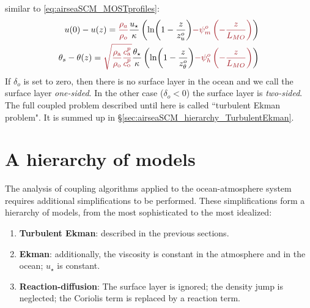 similar to \eqref{eq:airseaSCM_MOSTprofiles}:
\begin{equation}
\label{eq:airseaSCM_MOSTprofilesOSL}
\begin{aligned}
	u(0)-u(z) = \emphase{\frac{\rho_a}{\rho_o}}
	\frac{u_\star}{\kappa}
    \left(
	\ln(1-\frac{z}{z_{u}^o})
	\emphase{- \psi_m^o\left(-\frac{z}{L_{MO}}\right)}
    \right)
    \\
	\theta_s - \theta(z) = 
	\emphase{\sqrt{\frac{\rho_{\rm a}}{\rho_{\rm o}}
	\frac{c_{\rm a}^p}{c_{\rm o}^p}}}
	\frac{{\theta_\star}}{\kappa}
    \left(
	\ln(1-\frac{z}{z_{\theta}^o})
	\emphase{- \psi_h^o\left(-\frac{z}{L_{MO}}\right)}
\right)
\end{aligned}
\end{equation}
If $\delta_o$ is set to zero, then there is no surface layer
in the ocean and we call the surface layer \textit{one-sided}.
In the other case ($\delta_o<0$) the surface layer is
\textit{two-sided}.
The full coupled problem described until here
is called ``turbulent Ekman problem". It is summed up in
\S\ref{sec:airseaSCM_hierarchy_TurbulentEkman}.
\section{A hierarchy of models}
\label{sec:airseaSCM_hierarchy}
The analysis of coupling algorithms applied to the
ocean-atmosphere system requires additional
simplifications to be performed.
These simplifications form a hierarchy of models, from
the most sophisticated to the most idealized:
\begin{enumerate}
	\item \textbf{Turbulent Ekman}: described in the previous
		sections.
	\item \textbf{Ekman}: additionally,
		the viscosity is constant in the
		atmosphere and in the ocean; $u_\star$ is constant.
	\item \textbf{Reaction-diffusion}: The surface layer is ignored;
		the density jump is neglected;
		the Coriolis term is replaced by a reaction term.
\end{enumerate}
